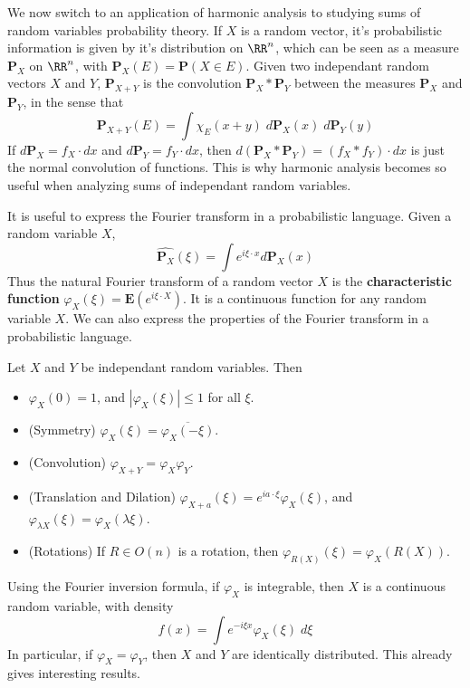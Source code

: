 We now switch to an application of harmonic analysis to studying sums of random variables probability theory. If $X$ is a random vector, it's probabilistic information is given by it's distribution on $\RR^n$, which can be seen as a measure $\mathbf{P}_X$ on $\RR^n$, with $\mathbf{P}_X(E) = \mathbf{P}(X \in E)$. Given two independant random vectors $X$ and $Y$, $\mathbf{P}_{X+Y}$ is the convolution $\mathbf{P}_X * \mathbf{P}_Y$ between the measures $\mathbf{P}_X$ and $\mathbf{P}_Y$, in the sense that
%
\[ \mathbf{P}_{X+Y}(E) = \int \chi_E(x+y)\; d\mathbf{P}_X(x)\; d\mathbf{P}_Y(y) \]
%
If $d\mathbf{P}_X = f_X \cdot dx$ and $d\mathbf{P}_Y = f_Y \cdot dx$, then $d(\mathbf{P}_X * \mathbf{P}_Y) = (f_X * f_Y) \cdot dx$ is just the normal convolution of functions. This is why harmonic analysis becomes so useful when analyzing sums of independant random variables.

It is useful to express the Fourier transform in a probabilistic language. Given a random variable $X$,
%
\[ \widehat{\mathbf{P}_X}(\xi) = \int e^{i \xi \cdot x} d\mathbf{P}_X(x) \]
%
Thus the natural Fourier transform of a random vector $X$ is the {\bf characteristic function} $\varphi_X(\xi) = \mathbf{E}(e^{i \xi \cdot X})$. It is a continuous function for any random variable $X$. We can also express the properties of the Fourier transform in a probabilistic language.

\begin{lemma}
	Let $X$ and $Y$ be independant random variables. Then
	\begin{itemize}
		\item $\varphi_X(0) = 1$, and $|\varphi_X(\xi)| \leq 1$ for all $\xi$.

		\item (Symmetry) $\varphi_X(\xi) = \overline{\varphi_X(-\xi)}$.

		\item (Convolution) $\varphi_{X+Y} = \varphi_X \varphi_Y$.

		\item (Translation and Dilation) $\varphi_{X+a}(\xi) = e^{i a \cdot \xi} \varphi_X(\xi)$, and $\varphi_{\lambda X}(\xi) = \varphi_X(\lambda \xi)$.

		\item (Rotations) If $R \in O(n)$ is a rotation, then $\varphi_{R(X)}(\xi) = \varphi_X(R(X))$.
	\end{itemize}
\end{lemma}

Using the Fourier inversion formula, if $\varphi_X$ is integrable, then $X$ is a continuous random variable, with density
%
\[ f(x) = \int e^{- i \xi x} \varphi_X(\xi)\; d\xi \]
%
In particular, if $\varphi_X = \varphi_Y$, then $X$ and $Y$ are identically distributed. This already gives interesting results.

